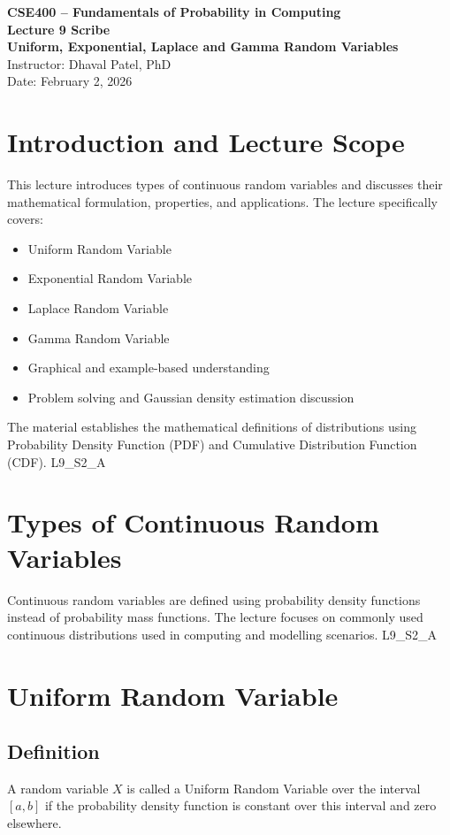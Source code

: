 \documentclass[12pt]{article}
\begin{document}
\onehalfspacing

\begin{center}
\textbf{CSE400 – Fundamentals of Probability in Computing} \\
\textbf{Lecture 9 Scribe} \\
\textbf{Uniform, Exponential, Laplace and Gamma Random Variables} \\
Instructor: Dhaval Patel, PhD \\
Date: February 2, 2026
\end{center}

\section{Introduction and Lecture Scope}
This lecture introduces types of continuous random variables and discusses their mathematical formulation, properties, and applications. The lecture specifically covers:

\begin{itemize}
\item Uniform Random Variable
\item Exponential Random Variable
\item Laplace Random Variable
\item Gamma Random Variable
\item Graphical and example-based understanding
\item Problem solving and Gaussian density estimation discussion
\end{itemize}

The material establishes the mathematical definitions of distributions using Probability Density Function (PDF) and Cumulative Distribution Function (CDF). L9\_S2\_A

\section{Types of Continuous Random Variables}
Continuous random variables are defined using probability density functions instead of probability mass functions. The lecture focuses on commonly used continuous distributions used in computing and modelling scenarios. L9\_S2\_A

\section{Uniform Random Variable}

\subsection{Definition}
A random variable $X$ is called a Uniform Random Variable over the interval $[a,b]$ if the probability density function is constant over this interval and zero elsewhere.
\end{document}
